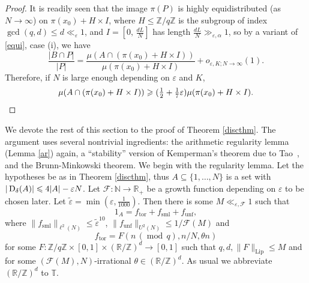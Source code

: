 \documentclass[10pt,reqno]{amsart}
\theoremstyle{definition}
\theoremstyle{remark}
\newcommand{\md}[1]{\ensuremath{\,(\operatorname{mod}\, #1)}}
\renewcommand{\leq}{\leqslant}
\renewcommand{\geq}{\geqslant}
\newcommand\Lip{\operatorname{Lip}}
\newcommand\tor{\operatorname{tor}}
\newcommand\sml{\operatorname{sml}}
\newcommand\unf{\operatorname{unf}}
\def\R{\mathbb{R}}
\def\Z{\mathbb{Z}}
\def\N{\mathbb{N}}
\def\T{\mathbb{T}}
\def\eps{\varepsilon}
\numberwithin{equation}{section}
\begin{document}
\begin{proof}
It is readily seen that the image $\pi(P)$ is highly equidistributed (as $N \rightarrow \infty$) on $\pi(x_0) + H \times I$, where $H \leq \Z/q\Z$ is the subgroup of index $\gcd(q,d)\leq d \ll_{\eps} 1$, and $I = \left[0,\, \frac{d L}{N} \right]$ has length $\frac{d L}{N} \gg_{\eps, \alpha} 1$, so by a variant of \eqref{equi}, case (i), we have \[\frac{|B\cap P|}{|P|} = \frac{\mu(A \cap (\pi(x_0) + H \times I))}{\mu(\pi(x_0) + H\times I)} + o_{\eps, K; N \to \infty}(1).\] Therefore, if $N$ is large enough depending on $\eps$ and $K$, \[\mu(A \cap (\pi(x_0) + H \times I)) \geq (\tfrac{1}{2} + \tfrac{1}{7} \eps) \mu(\pi(x_0) + H \times I).\qedhere\]
\end{proof}

We devote the rest of this section to the proof of Theorem \ref{discthm}. The argument uses several nontrivial ingredients: the arithmetic regularity lemma (Lemma \ref{ar}) again, a ``stability'' version of Kemperman's theorem due to Tao~\cite{tao-blog},\cite[Section 3.2]{tao-kemperman} and the Brunn-Minkowski theorem. We begin with the regularity lemma. 
Let the hypotheses be as in Theorem \ref{discthm}, thus $A \subseteq \{1,\dots,N\}$ is a set with $|\Sym_{\delta}(A)| \leq 4|A| - \eps N$. Let $\mathcal{F} : \N \rightarrow \R_+$ be a growth function depending on $\eps$ to be chosen later. Let $\tilde\eps = \min\left(\eps,\tfrac{1}{1000}\right)$. Then there is some $M \ll_{\eps,\mathcal{F}}1$ such that \[ 1_A = f_{\tor} + f_{\sml} + f_{\unf},\]where $\| f_{\sml} \|_{\ell^2(N)} \leq \tilde\eps^{10}$, $\| f_{\unf} \|_{U^2(N)} \leq 1/\mathcal{F}(M)$ and \[f_{\tor} = F(n \md{q}, n/N, \theta n)\] for some $F : \Z/q\Z \times [0,1] \times(\R/\Z)^d \to [0,1]$ such that $q,d,\|F\|_{\Lip} \leq M$ and for some $(\mathcal{F}(M),N)$-irrational $\theta\in(\R/\Z)^d$. As usual we abbreviate $(\R/\Z)^d$ to $\T$.
\end{document}
